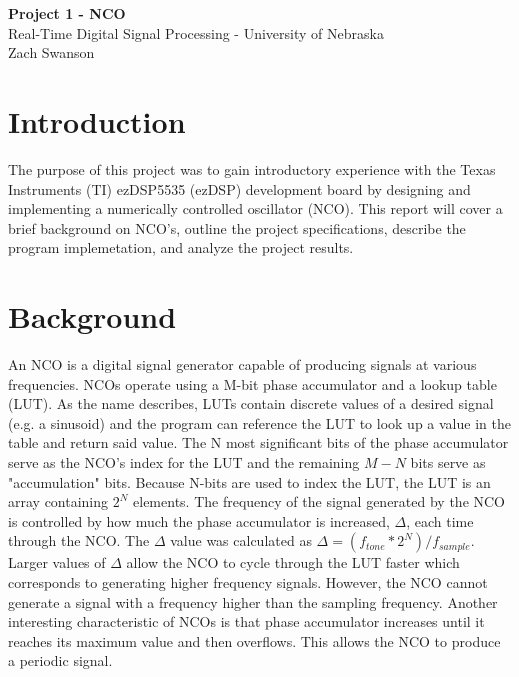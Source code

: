 \documentclass[11pt,pdftex,portrait,letterpaper]{article}
\begin{document}
\vspace*{30ex}
\begin{center}

\textbf{Project 1 - NCO}\\

\vspace{4ex}
Real-Time Digital Signal Processing - University of Nebraska \\

\vspace{4ex}
Zach Swanson\\

\end{center}


\pagebreak
\tableofcontents
\pagebreak


\section{Introduction}

The purpose of this project was to gain introductory experience with the Texas Instruments (TI) ezDSP5535 (ezDSP) development board by designing and implementing a numerically controlled oscillator (NCO). This report will cover a brief background on NCO's, outline the project specifications, describe the program implemetation, and analyze the project results.

\section{Background}

An NCO is a digital signal generator capable of producing signals at various frequencies. NCOs operate using a M-bit phase accumulator and a lookup table (LUT). As the name describes, LUTs contain discrete values of a desired signal (e.g. a sinusoid) and the program can reference the LUT to look up a value in the table and return said value. The N most significant bits of the phase accumulator serve as the NCO's index for the LUT and the remaining \( M - N \) bits serve as "accumulation" bits. Because N-bits are used to index the LUT, the LUT is an array containing \(  2^N \) elements. The frequency of the signal generated by the NCO is controlled by how much the phase accumulator is increased, $\Delta$, each time through the NCO. The $\Delta$ value was calculated as \(\Delta =( {f}_{tone}*  2^N ) / {f}_{sample} \). Larger values of $\Delta$  allow the NCO to cycle through the LUT faster which corresponds to generating higher frequency signals. However, the NCO cannot generate a signal with a frequency higher than the sampling frequency. Another interesting characteristic of NCOs is that phase accumulator increases until it reaches its maximum value and then overflows. This allows the NCO to produce a periodic signal.
\end{document}
